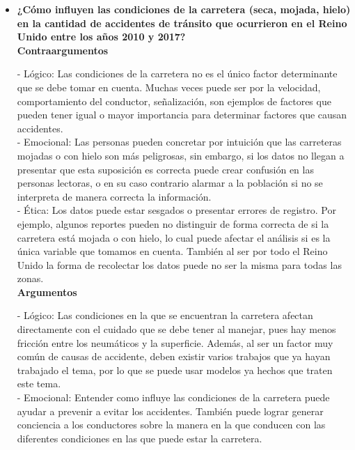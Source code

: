 \documentclass[12pt]{article}
\begin{document}
\begin{itemize}
    \item[1.] \textbf{¿Cómo influyen las condiciones de la carretera (seca, mojada, hielo) en la cantidad de accidentes de tránsito que ocurrieron en el Reino Unido entre los años 2010 y 2017? } \\
    
    \textbf{Contraargumentos}
    
    - Lógico:  Las condiciones de la carretera no es el único factor determinante que se debe tomar en cuenta. Muchas veces puede ser por la velocidad, comportamiento del conductor, señalización, son ejemplos de factores que pueden tener igual o mayor importancia para determinar factores que causan accidentes. \\
    
    - Emocional:  Las personas pueden concretar por intuición que las carreteras mojadas o con hielo son más peligrosas, sin embargo, si los datos no llegan a presentar que esta suposición es correcta puede crear confusión en las personas lectoras, o en su caso contrario alarmar a la población si no se interpreta de manera correcta la información. \\
    
    - Ética: Los datos puede estar sesgados o presentar errores de registro. Por ejemplo, algunos reportes pueden no distinguir de forma correcta de si la carretera está mojada o con hielo, lo cual puede afectar el análisis si es la única variable que tomamos en cuenta. También al ser por todo el Reino Unido la forma de recolectar los datos puede no ser la misma para todas las zonas. \\
    
    \textbf{Argumentos} 
    
    - Lógico: Las condiciones en la que se encuentran la carretera afectan directamente con el cuidado que se debe tener al manejar, pues hay menos fricción entre los neumáticos y la superficie. Además, al ser un factor muy común de causas de accidente, deben existir varios trabajos que ya hayan trabajado el tema, por lo que se puede usar modelos ya hechos que traten este tema. \\
    
    - Emocional: Entender como influye las condiciones de la carretera puede ayudar a prevenir a evitar los accidentes. También puede lograr generar conciencia a los conductores sobre la manera en la que conducen con las diferentes condiciones en las que puede estar la carretera. \\
    

\end{itemize}
\end{document}
